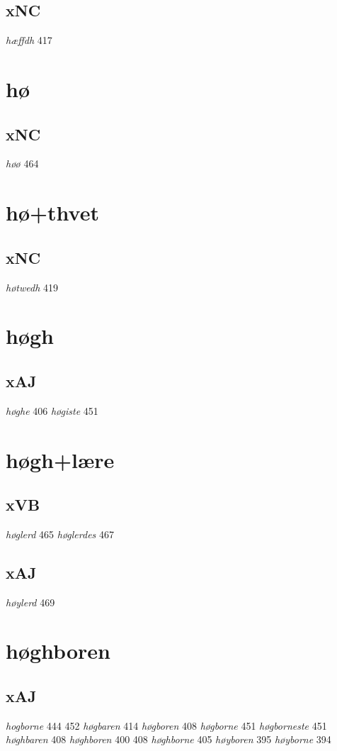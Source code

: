 \documentclass[a4paper,twocolumn]{article}
\begin{document}
\subsection{xNC}
\label{sec:org7349753}
\emph{hæffdh} 417 
\section{hø}
\label{sec:orgd849119}
\subsection{xNC}
\label{sec:orgdcd350e}
\emph{høø} 464 
\section{hø+thvet}
\label{sec:org4a7f1dc}
\subsection{xNC}
\label{sec:orge860c1c}
\emph{høtwedh} 419 
\section{høgh}
\label{sec:org636c453}
\subsection{xAJ}
\label{sec:orgbead4ac}
\emph{høghe} 406 \emph{høgiste} 451 
\section{høgh+lære}
\label{sec:orgf76a399}
\subsection{xVB}
\label{sec:org893ac12}
\emph{høglerd} 465 \emph{høglerdes} 467 
\subsection{xAJ}
\label{sec:orga409701}
\emph{høylerd} 469 
\section{høghboren}
\label{sec:org57d5cc3}
\subsection{xAJ}
\label{sec:org82415b6}
\emph{hogborne} 444 452 \emph{høgbaren} 414 \emph{høgboren} 408 \emph{høgborne} 451 \emph{høgborneste} 451 \emph{høghbaren} 408 \emph{høghboren} 400 408 \emph{høghborne} 405 \emph{høyboren} 395 \emph{høyborne} 394 
\end{document}
